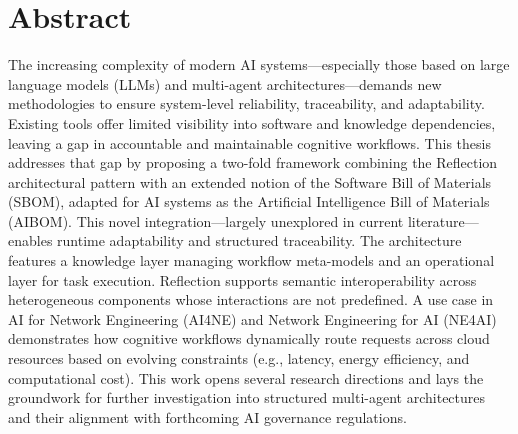 \chapter{Abstract}\label{ch:introduzione}
The increasing complexity of modern AI systems—especially those based on large language models (LLMs) and multi-agent architectures—demands new methodologies to ensure system-level reliability, traceability, and adaptability. Existing tools offer limited visibility into software and knowledge dependencies, leaving a gap in accountable and maintainable cognitive workflows. This thesis addresses that gap by proposing a two-fold framework combining the Reflection architectural pattern with an extended notion of the Software Bill of Materials (SBOM), adapted for AI systems as the Artificial Intelligence Bill of Materials (AIBOM). This novel integration—largely unexplored in current literature—enables runtime adaptability and structured traceability. The architecture features a knowledge layer managing workflow meta-models and an operational layer for task execution. Reflection supports semantic interoperability across heterogeneous components whose interactions are not predefined. A use case in AI for Network Engineering (AI4NE) and Network Engineering for AI (NE4AI) demonstrates how cognitive workflows dynamically route requests across cloud resources based on evolving constraints (e.g., latency, energy efficiency, and computational cost). This work opens several research directions and lays the groundwork for further investigation into structured multi-agent architectures and their alignment with forthcoming AI governance regulations.

